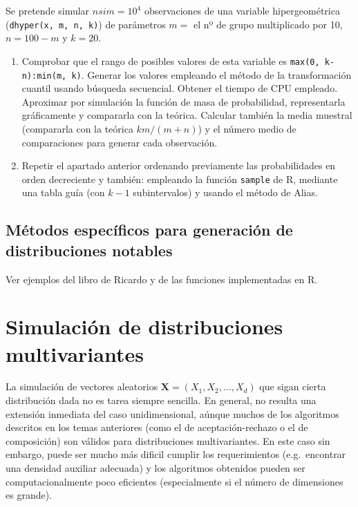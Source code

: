 \documentclass[
]{book}
\theoremstyle{break}
\theoremstyle{definition}
\theoremstyle{definition}
\theoremstyle{definition}
\theoremstyle{remark}
\let\BeginKnitrBlock\begin \let\EndKnitrBlock\end
\begin{document}
\BeginKnitrBlock{exercise}[propuesto]
\protect\hypertarget{exr:hipergeom}{}{\label{exr:hipergeom} \iffalse (propuesto) \fi{} }
\EndKnitrBlock{exercise}

Se pretende simular \(nsim=10^{4}\) observaciones de una variable
hipergeométrica (\texttt{dhyper(x,\ m,\ n,\ k)}) de parámetros \(m=\) el nº
de grupo multiplicado por 10, \(n=100-m\) y \(k=20\).

\begin{enumerate}
\def\labelenumi{\alph{enumi})}
\item
  Comprobar que el rango de posibles valores de esta variable es
  \texttt{max(0,\ k-n):min(m,\ k)}. Generar los valores empleando el método
  de la transformación cuantil usando búsqueda secuencial. Obtener
  el tiempo de CPU empleado. Aproximar por simulación la función
  de masa de probabilidad, representarla gráficamente y compararla
  con la teórica. Calcular también la media muestral (compararla
  con la teórica \(km/(m+n)\)) y el número medio de comparaciones
  para generar cada observación.
\item
  Repetir el apartado anterior ordenando previamente las
  probabilidades en orden decreciente y también: empleando la
  función \texttt{sample} de R, mediante una tabla guía (con
  \(k-1\) subintervalos) y usando el método de Alias.
\end{enumerate}

\hypertarget{muxe9todos-especuxedficos-para-generaciuxf3n-de-distribuciones-notables}{%
\section{Métodos específicos para generación de distribuciones notables}\label{muxe9todos-especuxedficos-para-generaciuxf3n-de-distribuciones-notables}}

Ver ejemplos del libro de Ricardo
y de las funciones implementadas en R.

\hypertarget{simulaciuxf3n-de-distribuciones-multivariantes}{%
\chapter{Simulación de distribuciones multivariantes}\label{simulaciuxf3n-de-distribuciones-multivariantes}}

La simulación de vectores aleatorios \(\mathbf{X} =\left( X_1,X_2,\ldots,X_d\right)\) que sigan cierta distribución dada no es tarea siempre sencilla.
En general, no resulta una extensión inmediata del caso unidimensional,
aúnque muchos de los algoritmos descritos en los temas anteriores (como el de aceptación-rechazo o el de composición) son válidos para distribuciones multivariantes.
En este caso sin embargo, puede ser mucho más dificil cumplir los requerimientos (e.g.~encontrar una densidad auxiliar adecuada) y los algoritmos obtenidos pueden ser computacionalmente poco eficientes (especialmente si el número de dimensiones es grande).
\end{document}
